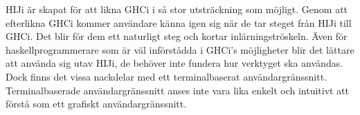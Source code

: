 HIJi är skapat för att likna GHCi i så stor utsträckning som möjligt.
Genom att efterlikna GHCi kommer användare känna igen sig när de tar steget från HIJi till GHCi. Det blir för dem ett naturligt steg och kortar inlärningströskeln. Även för haskellprogrammerare som är väl införstådda i GHCi's möjligheter blir det lättare att använda sig utav HIJi, de behöver inte fundera hur verktyget ska användas.
Dock finns det vissa nackdelar med ett terminalbaserat användargränssnitt. Terminalbaserade användargränssnitt anses inte vara lika enkelt och intuitivt att förstå som ett grafiskt användargränssnitt. 
